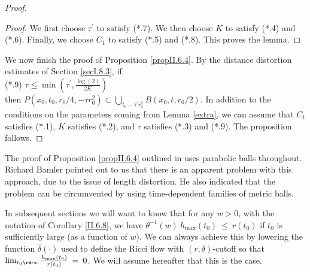 \begin{proof}
\begin{proof}
We first choose $\tau^\prime$ to satisfy (*.7).
We then choose $K$ to satisfy (*.4) and (*.6).
Finally, we choose $C_1$ to
satisfy (*.5) and (*.8).
This proves the lemma.
\end{proof}

We now finish the proof of Proposition \ref{propII.6.4}.
By the distance distortion estimates of Section \ref{secI.8.3}, if\\
(*.9) $\tau \le \min \left( \tau^\prime, \frac{\log(2)}{2K} \right)$\\
then $P(x_0, t_0, r_0/4, -\tau r_0^2) \subset
\bigcup_{t_0 - \tau^\prime r_0^2} B(x_0, t, r_0/2)$.
In addition to the conditions on the parameters coming from
Lemma \ref{extra}, we can assume that $C_1$ satisfies (*.1),
$K$ satisfies (*.2), and
$\tau$ satisfies (*.3) and (*.9). The proposition follows.
\end{proof}

\begin{remark}
  \label{rem:kl-earlier-scalar-curvature-bounds-smaller-balls-from-lower-curvature-bound-existence-scalar-curvature}

The proof of Proposition \ref{propII.6.4} outlined in
\cite[Pf. of II.6.4]{Perelman2}
uses parabolic balls throughout.  Richard Bamler pointed out
to us that there is an apparent problem with this approach,
due to the issue of length distortion.
He also indicated that the problem can be circumvented
by using time-dependent families of metric balls.
\end{remark}

\begin{remark}
  \label{rem:kl-earlier-scalar-curvature-bounds-smaller-balls-from-lower-curvature-bound-structural-remark-scalar-curvature}
 \label{hmax}
In subsequent sections we will want to know that for any
$w > 0$, with the notation
of Corollary \ref{II.6.8}, we have
$\theta^{-1}(w) \: h_{\max}(t_0) \: \le \: r(t_0)$ if $t_0$ is
sufficiently large (as a function of $w$).
We can always achieve this by lowering the function $\overline{\delta}(\cdot)$
used to define the Ricci flow with $(r, \delta)$-cutoff so that
$\lim_{t_0 \ra \infty} \frac{h_{\max}(t_0)}{r(t_0)} \: = \: 0$.
We will assume hereafter that this is the case.
\end{remark}

